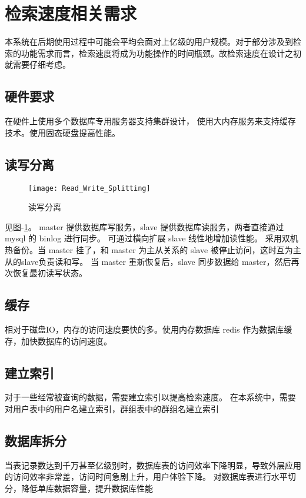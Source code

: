 {\color{red}
\section{检索速度相关需求}
本系统在后期使用过程中可能会平均会面对上亿级的用户规模。对于部分涉及到检索的功能需求而言，检索速度将成为功能操作的时间瓶颈。故检索速度在设计之初就需要仔细考虑。
\subsection{硬件要求}
在硬件上使用多个数据库专用服务器支持集群设计，
使用大内存服务来支持缓存技术。使用固态硬盘提高性能。


\subsection{读写分离}

\begin{figure}[h]
	\centering
	\texttt{[image: Read\_Write\_Splitting]}
	\caption{读写分离} \label{fig:Read_Write_Splitting}
\end{figure}

见图-\ref{fig:Read_Write_Splitting}。
master 提供数据库写服务，slave 提供数据库读服务，两者直接通过 mysql 的 binlog 进行同步。
可通过横向扩展 slave 线性地增加读性能。
采用双机热备份。当 master 挂了，和 master 为主从关系的 slave 被停止访问，这时互为主从的slave负责读和写。
当 master 重新恢复后，slave 同步数据给 master，然后再次恢复最初读写状态。


\subsection{缓存}
相对于磁盘IO，内存的访问速度要快的多。使用内存数据库 redis 作为数据库缓存，加快数据库的访问速度。


\subsection{建立索引}
对于一些经常被查询的数据，需要建立索引以提高检索速度。
在本系统中，需要对用户表中的用户名建立索引，群组表中的群组名建立索引


\subsection{数据库拆分}
当表记录数达到千万甚至亿级别时，数据库表的访问效率下降明显，导致外层应用的访问效率非常差，访问时间急剧上升，用户体验下降。
对数据库表进行水平切分，降低单库数据容量，提升数据库性能


}